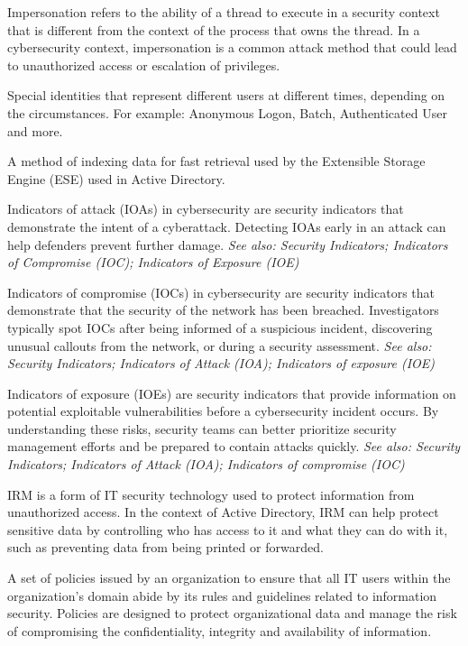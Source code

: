  Impersonation refers to the ability of a thread to execute in a security context that is different from the context of the process that owns the thread. In a cybersecurity context, impersonation is a common attack method that could lead to unauthorized access or escalation of privileges.

 Special identities that represent different users at different times, depending on the circumstances. For example: Anonymous Logon, Batch, Authenticated User and more.

 A method of indexing data for fast retrieval used by the Extensible Storage Engine (ESE) used in Active Directory.

 Indicators of attack (IOAs) in cybersecurity are security indicators that demonstrate the intent of a cyberattack. Detecting IOAs early in an attack can help defenders prevent further damage.
\textit{See also: Security Indicators; Indicators of Compromise (IOC); Indicators of Exposure (IOE)}

 Indicators of compromise (IOCs) in cybersecurity are security indicators that demonstrate that the security of the network has been breached. Investigators typically spot IOCs after being informed of a suspicious incident, discovering unusual callouts from the network, or during a security assessment.
\textit{See also: Security Indicators; Indicators of Attack (IOA); Indicators of exposure (IOE)}

 Indicators of exposure (IOEs) are security indicators that provide information on potential exploitable vulnerabilities before a cybersecurity incident occurs. By understanding these risks, security teams can better prioritize security management efforts and be prepared to contain attacks quickly.
\textit{See also: Security Indicators; Indicators of Attack (IOA); Indicators of compromise (IOC)}

 IRM is a form of IT security technology used to protect information from unauthorized access. In the context of Active Directory, IRM can help protect sensitive data by controlling who has access to it and what they can do with it, such as preventing data from being printed or forwarded.

 A set of policies issued by an organization to ensure that all IT users within the organization’s domain abide by its rules and guidelines related to information security. Policies are designed to protect organizational data and manage the risk of compromising the confidentiality, integrity and availability of information.

